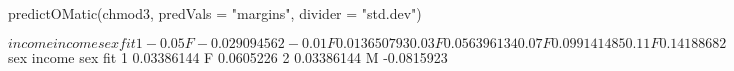 \begin{Schunk}
\begin{Sinput}
 predictOMatic(chmod3, predVals = "margins", divider = "std.dev")
\end{Sinput}
\begin{Soutput}
$income
  income sex         fit
1  -0.05   F -0.02909456
2  -0.01   F  0.01365079
3   0.03   F  0.05639613
4   0.07   F  0.09914148
5   0.11   F  0.14188682

$sex
      income sex        fit
1 0.03386144   F  0.0605226
2 0.03386144   M -0.0815923
\end{Soutput}
\end{Schunk}
